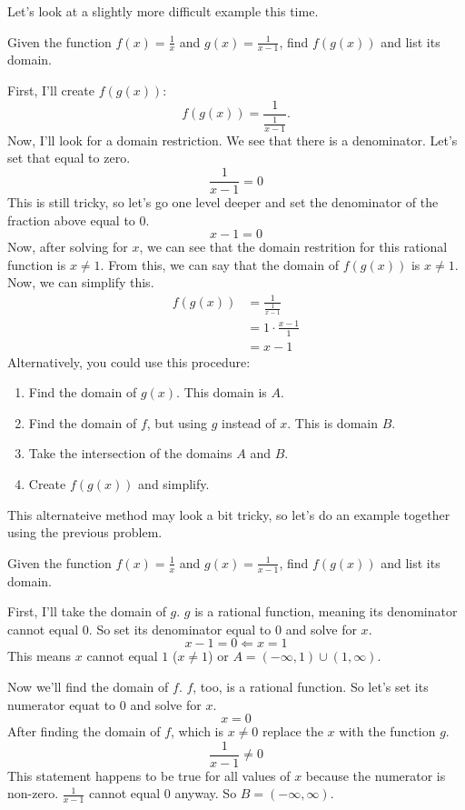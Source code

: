 Let's look at a slightly more difficult example this time.

Given the function $f(x) = \frac{1}{x}$ and $g(x) = \frac{1}{x - 1}$, find $f(g(x))$ and list its domain.

First, I'll create $f(g(x))$:
\[
f(g(x)) = \frac{1}{\frac{1}{x - 1}} \text{.}
\]
Now, I'll look for a domain restriction. We see that there is a denominator. Let's set that equal to zero.
\[
\frac{1}{x - 1} = 0
\]
This is still tricky, so let's go one level deeper and set the denominator of the fraction above equal to $0$.
\[
x - 1 = 0
\]
Now, after solving for $x$, we can see that the domain restrition for this rational function is $x \neq 1$. From this, we can say that the domain of $f(g(x))$ is $x \neq 1$. Now, we can simplify this.
\begin{align*}
f(g(x)) &= \frac{1}{\frac{1}{x - 1}} \\
&= 1 \cdot \frac{x - 1}{1} \\
&= x - 1
\end{align*}
Alternatively, you could use this procedure:
\begin{enumerate}
    \item Find the domain of $g(x)$. This domain is $A$.
    \item Find the domain of $f$, but using $g$ instead of $x$. This is domain $B$.
    \item Take the intersection of the domains $A$ and $B$.
    \item Create $f(g(x))$ and simplify.
\end{enumerate}
This alternateive method may look a bit tricky, so let's do an example together using the previous problem.

Given the function $f(x) = \frac{1}{x}$ and $g(x) = \frac{1}{x - 1}$, find $f(g(x))$ and list its domain.

First, I'll take the domain of $g$. $g$ is a rational function, meaning its denominator cannot equal $0$. So set its denominator equal to $0$ and solve for $x$.
\[
x - 1 = 0 \Longleftarrow x = 1
\]
This means $x$ cannot equal $1$ ($x \neq 1$) or $A = (-\infty, 1) \cup (1, \infty)$.

Now we'll find the domain of $f$. $f$, too, is a rational function. So let's set its numerator equat to $0$ and solve for $x$.
\[
x = 0
\]
After finding the domain of $f$, which is $x \neq 0$ replace the $x$ with the function $g$.
\[
\frac{1}{x - 1} \neq 0
\]
This statement happens to be true for all values of $x$ because the numerator is non-zero. $\frac{1}{x - 1}$ cannot equal $0$ anyway. So $B = (-\infty, \infty)$.

